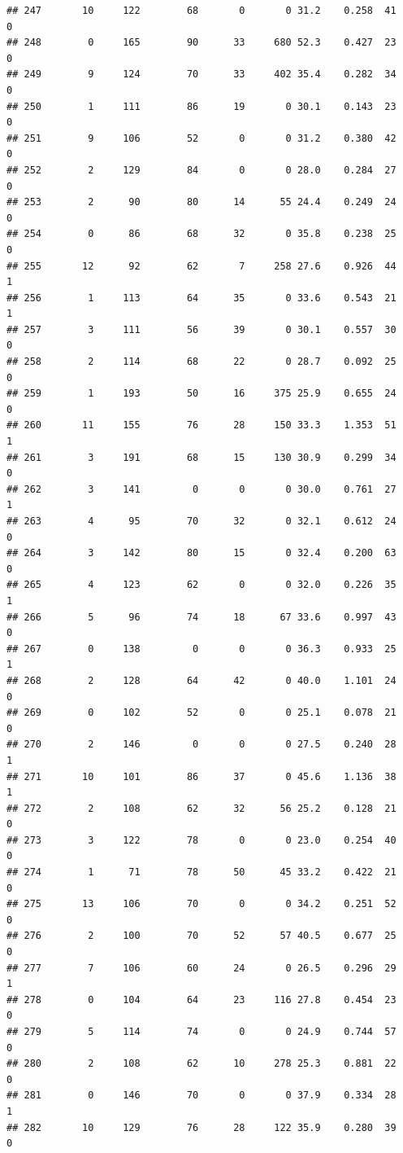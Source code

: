 \documentclass[11pt, a4paper]{article}\usepackage[]{graphicx}\usepackage[]{xcolor}
\makeatletter
\newenvironment{kframe}{%
 \def\at@end@of@kframe{}%
 \ifinner\ifhmode%
  \def\at@end@of@kframe{\end{minipage}}%
  \begin{minipage}{\columnwidth}%
 \fi\fi%
 \def\FrameCommand##1{\hskip\@totalleftmargin \hskip-\fboxsep
 \colorbox{shadecolor}{##1}\hskip-\fboxsep
     \hskip-\linewidth \hskip-\@totalleftmargin \hskip\columnwidth}%
 \MakeFramed {\advance\hsize-\width
   \@totalleftmargin\z@ \linewidth\hsize
   \@setminipage}}%
 {\par\unskip\endMakeFramed%
 \at@end@of@kframe}
\newenvironment{knitrout}{}{} %
\makeatother
\begin{document}
\begin{knitrout}
\begin{kframe}
\begin{verbatim}
## 247       10     122        68       0       0 31.2    0.258  41    0
## 248        0     165        90      33     680 52.3    0.427  23    0
## 249        9     124        70      33     402 35.4    0.282  34    0
## 250        1     111        86      19       0 30.1    0.143  23    0
## 251        9     106        52       0       0 31.2    0.380  42    0
## 252        2     129        84       0       0 28.0    0.284  27    0
## 253        2      90        80      14      55 24.4    0.249  24    0
## 254        0      86        68      32       0 35.8    0.238  25    0
## 255       12      92        62       7     258 27.6    0.926  44    1
## 256        1     113        64      35       0 33.6    0.543  21    1
## 257        3     111        56      39       0 30.1    0.557  30    0
## 258        2     114        68      22       0 28.7    0.092  25    0
## 259        1     193        50      16     375 25.9    0.655  24    0
## 260       11     155        76      28     150 33.3    1.353  51    1
## 261        3     191        68      15     130 30.9    0.299  34    0
## 262        3     141         0       0       0 30.0    0.761  27    1
## 263        4      95        70      32       0 32.1    0.612  24    0
## 264        3     142        80      15       0 32.4    0.200  63    0
## 265        4     123        62       0       0 32.0    0.226  35    1
## 266        5      96        74      18      67 33.6    0.997  43    0
## 267        0     138         0       0       0 36.3    0.933  25    1
## 268        2     128        64      42       0 40.0    1.101  24    0
## 269        0     102        52       0       0 25.1    0.078  21    0
## 270        2     146         0       0       0 27.5    0.240  28    1
## 271       10     101        86      37       0 45.6    1.136  38    1
## 272        2     108        62      32      56 25.2    0.128  21    0
## 273        3     122        78       0       0 23.0    0.254  40    0
## 274        1      71        78      50      45 33.2    0.422  21    0
## 275       13     106        70       0       0 34.2    0.251  52    0
## 276        2     100        70      52      57 40.5    0.677  25    0
## 277        7     106        60      24       0 26.5    0.296  29    1
## 278        0     104        64      23     116 27.8    0.454  23    0
## 279        5     114        74       0       0 24.9    0.744  57    0
## 280        2     108        62      10     278 25.3    0.881  22    0
## 281        0     146        70       0       0 37.9    0.334  28    1
## 282       10     129        76      28     122 35.9    0.280  39    0

\end{verbatim}
\end{kframe}
\end{knitrout}
\end{document}
